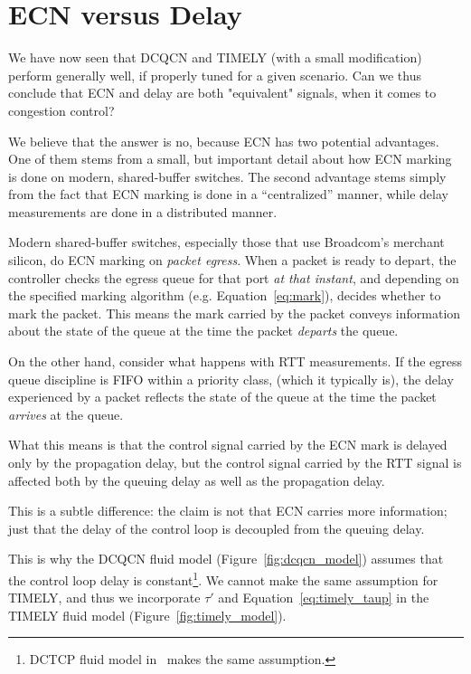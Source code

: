\section {ECN versus Delay}
\label{sec:discuss}

We have now seen that DCQCN and TIMELY (with a small modification) perform
generally well, if properly tuned for a given scenario. Can we thus conclude
that ECN and delay are both "equivalent" signals, when it comes to congestion
control? 

We believe that the answer is no, because ECN has two potential advantages.  One
of them stems from a small, but important detail about how ECN marking is done
on modern, shared-buffer switches.  The second advantage stems simply from the
fact that ECN marking is done in a ``centralized'' manner, while delay
measurements are done in a distributed manner.

Modern shared-buffer switches, especially those that use Broadcom's merchant
silicon, do ECN marking on {\em packet egress}. When a packet is ready to
depart, the controller checks the egress queue for that port {\em at that
instant}, and depending on the specified marking algorithm (e.g.
Equation~\ref{eq:mark}), decides whether to mark the packet. This means the mark
carried by the packet conveys information about the state of the queue at the
time the packet {\em departs} the queue. 

On the other hand, consider what happens with RTT measurements. If the egress
queue discipline is FIFO within a priority class, (which it typically is), the
delay experienced by a packet reflects the state of the queue at the time the
packet {\em arrives} at the queue. 

What this means is that the control signal carried by the ECN mark is delayed
only by the propagation delay, but the control signal carried by the RTT signal
is affected both by the queuing delay as well as the propagation delay. 

This is a subtle difference: the claim is not that ECN carries more information;
just that the delay of the control loop is decoupled from the queuing delay.

This is why the DCQCN fluid model (Figure~\ref{fig:dcqcn_model}) assumes that
the control loop delay is constant\footnote{DCTCP fluid model
in~\cite{dctcp-analysis} makes the same assumption.}. We cannot make the same
assumption for TIMELY, and  thus we incorporate $\tau'$ and
Equation~\ref{eq:timely_taup} in the TIMELY fluid model
(Figure~\ref{fig:timely_model}).

